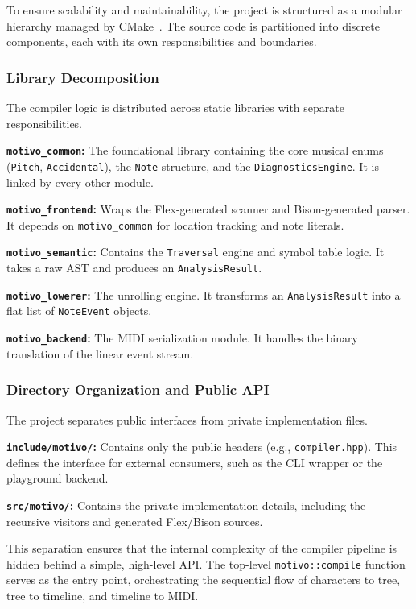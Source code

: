 To ensure scalability and maintainability, the project is structured as a modular hierarchy managed by
CMake~\cite{CMake_2026}.
The source code is partitioned into discrete components, each with its own responsibilities and boundaries.

\subsubsection{Library Decomposition}

The compiler logic is distributed across static libraries with separate responsibilities.

\noindent \textbf{\texttt{motivo\_common}:} The foundational library containing the core musical enums (\texttt{Pitch},
\texttt{Accidental}), the \texttt{Note} structure, and the \texttt{DiagnosticsEngine}.
It is linked by every other module.

\noindent \textbf{\texttt{motivo\_frontend}:} Wraps the Flex-generated scanner and Bison-generated parser.
It depends on \texttt{motivo\_common} for location tracking and note literals.

\noindent \textbf{\texttt{motivo\_semantic}:} Contains the \texttt{Traversal} engine and symbol table logic.
It takes a raw AST and produces an \texttt{AnalysisResult}.

\noindent \textbf{\texttt{motivo\_lowerer}:} The unrolling engine.
It transforms an \texttt{AnalysisResult} into a flat list of \texttt{NoteEvent} objects.

\noindent \textbf{\texttt{motivo\_backend}:} The MIDI serialization module.
It handles the binary translation of the linear event stream.

\subsubsection{Directory Organization and Public API}

The project separates public interfaces from private implementation files.

\noindent \textbf{\texttt{include/motivo/}:} Contains only the public headers (e.g., \texttt{compiler.hpp}).
This defines the interface for external consumers, such as the CLI wrapper or the playground backend.

\noindent \textbf{\texttt{src/motivo/}:} Contains the private implementation details, including the recursive
visitors and
generated Flex/Bison sources.

This separation ensures that the internal complexity of the compiler pipeline is hidden behind a simple, high-level
API\@.
The top-level \texttt{motivo::compile} function serves as the entry point, orchestrating the sequential flow
of characters
to tree, tree to timeline, and timeline to MIDI\@.
